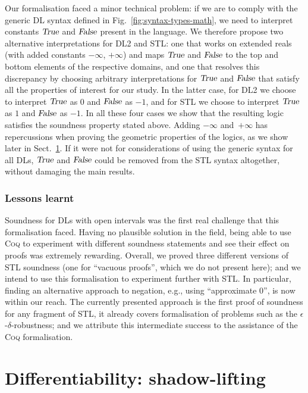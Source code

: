 \documentclass[a4paper,UKenglish,cleveref, autoref, thm-restate]{lipics-v2021}
\def\DLtwo{\textrm{DL2}}
\def\STL{\textrm{STL}}
\def\True{\textsl{True}}
\def\False{\textsl{False}}
\def\coq{\textsc{Coq}}
\begin{document}
Our formalisation faced a minor technical problem: if we are to 
comply with the generic DL syntax defined in Fig.~\ref{fig:syntax-types-math},
we need to interpret constants $\True$ and $\False$ present in the language.  
%
We therefore propose two alternative interpretations for \DLtwo{} and
\STL{}: one that works on extended reals (with added constants $-\infty$, $+\infty$) 
and maps $\True$ and $\False$ to the top and bottom elements of the 
respective domains, and one that
resolves this discrepancy by choosing arbitrary interpretations for
$\True$ and $\False$ that satisfy all the properties of interest for our
study.
%
In the latter case, for \DLtwo{} we choose to interpret $\True$ as $0$ and
$\False$ as $-1$, and for \STL{} we choose to interpret $\True$ as $1$ and $\False$
as $-1$.
%
In all these four cases we show that the resulting logic satisfies the
soundness property stated above.
%
Adding $-\infty$ and~$+\infty$ has repercussions when proving the
geometric properties of the logics, as we show later in
Sect.~\ref{sec:differentiability}. 
If it were not for considerations of using the generic 
syntax for all DLs, 
$\True$ and $\False$ could be removed from the \STL{} syntax altogether, 
without damaging the main results.

\subsubsection*{Lessons learnt}
Soundness for DLs with open intervals was the first real challenge that this formalisation faced.
Having no plausible solution in the field, being able to use \coq{} to 
experiment with different soundness statements and see their  effect on proofs 
was extremely rewarding. Overall, we proved three different versions of 
\STL{} soundness (one for ``vacuous proofs'', which we do not present here);
and we intend to use this formalisation to experiment further with \STL. 
In particular, finding an alternative approach to negation, e.g., using 
``approximate $0$'',
is now within our reach. 
The currently presented approach is the first proof of soundness for any fragment
of \STL{}, it already covers formalisation of problems such as the $\epsilon$-$\delta$-robustness;
 and we attribute this intermediate success to the assistance of the \coq{} formalisation.

\section{Differentiability: shadow-lifting}
\label{sec:differentiability}
\end{document}
